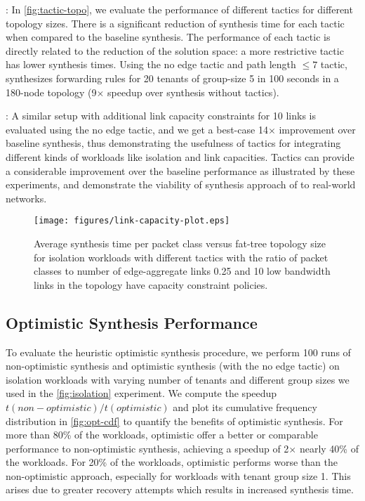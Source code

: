 : 
In \cref{fig:tactic-topo},
 we evaluate the performance of different tactics for different topology sizes. There is a
 significant reduction of synthesis time for each tactic when compared to the baseline synthesis.
 The performance of each tactic is directly related to the reduction of the solution space: a more
 restrictive tactic has lower synthesis times. 
  Using the no edge tactic
 and path length $\leq 7$ tactic, \Name synthesizes forwarding rules for 20 tenants of group-size 5 in 100 seconds in a 180-node
 topology (9$\times$ speedup over synthesis without tactics).
  
  : 
 A similar setup with additional link capacity 
 constraints for 10 links is evaluated using the no edge tactic, and we get a best-case 14$\times$
 improvement over baseline synthesis, thus demonstrating the usefulness of tactics for 
 integrating different kinds of workloads like isolation and link capacities. 
 Tactics can provide 
 a considerable improvement over the baseline performance as illustrated by these experiments,
 and demonstrate the viability of synthesis approach of \Name to real-world networks.  
 
\begin{figure}[h]
	\texttt{[image: figures/link-capacity-plot.eps]}
	\caption{Average synthesis time per packet class versus fat-tree topology size for isolation workloads 
		with different tactics with the ratio of packet classes to number of edge-aggregate links 0.25 and 10 low bandwidth links in the topology 
		have capacity constraint policies.}
	\label{fig:link-capacity}
\end{figure}


\subsection{Optimistic Synthesis Performance} \label{sec:optimisticeval}
To evaluate the heuristic optimistic synthesis procedure, we perform 100 runs of non-optimistic
 synthesis and optimistic synthesis (with the no edge tactic) on isolation
 workloads with varying number of tenants and different group sizes 
we used in the \cref{fig:isolation} experiment. We compute the
 speedup $t(non-optimistic)/t(optimistic)$ and plot its cumulative frequency
  distribution in \cref{fig:opt-cdf} to quantify the benefits of optimistic 
  synthesis. For more than 80\% of the
workloads, optimistic offer a better or comparable performance to non-optimistic synthesis, 
achieving a speedup of 2$\times$ nearly 40\% of the workloads. For 20\% of the workloads, optimistic
performs worse than the non-optimistic approach, especially for workloads with tenant group size 1. 
This arises due to greater recovery attempts which results in increased synthesis time. 

